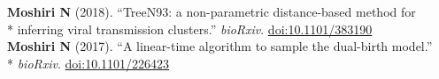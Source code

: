 \documentclass[margin,line]{res}
\begin{document}
\begin{resume}
\hspace*{4mm} \textbf{Moshiri N} (2018). ``TreeN93: a non-parametric distance-based method for\\*\vspace{2mm}
\hspace*{8mm} inferring viral transmission clusters.'' \textit{bioRxiv}. \href{https://doi.org/10.1101/383190}{doi:10.1101/383190}\\
\hspace*{4mm} \textbf{Moshiri N} (2017). ``A linear-time algorithm to sample the dual-birth model.''\\*\vspace{2mm}
\hspace*{8mm} \textit{bioRxiv}. \href{https://doi.org/10.1101/226423}{doi:10.1101/226423}\\


\end{resume}
\end{document}
